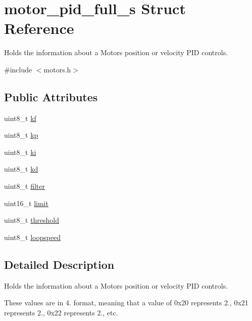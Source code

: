 \hypertarget{structmotor__pid__full__s}{}\section{motor\+\_\+pid\+\_\+full\+\_\+s Struct Reference}
\label{structmotor__pid__full__s}


Holds the information about a Motor\textquotesingle{}s position or velocity P\+ID controls.  




{\ttfamily \#include $<$motors.\+h$>$}

\subsection*{Public Attributes}
\begin{DoxyCompactItemize}
\item 
uint8\+\_\+t \mbox{\hyperlink{structmotor__pid__full__s_aca37978c9743342bf520dcadf2eed67c}{kf}}
\item 
uint8\+\_\+t \mbox{\hyperlink{structmotor__pid__full__s_a5c90af94c336d26a8ecdd4b88f06c9d9}{kp}}
\item 
uint8\+\_\+t \mbox{\hyperlink{structmotor__pid__full__s_ad6800234728012e59dc6c945cc6465d5}{ki}}
\item 
uint8\+\_\+t \mbox{\hyperlink{structmotor__pid__full__s_a02e542bcec0f870af870cd37a4e2a922}{kd}}
\item 
uint8\+\_\+t \mbox{\hyperlink{structmotor__pid__full__s_af6f15fc8e1a49098f69aba255a3b21c6}{filter}}
\item 
uint16\+\_\+t \mbox{\hyperlink{structmotor__pid__full__s_a98141ce9bce70a500cf18c7a92d866c5}{limit}}
\item 
uint8\+\_\+t \mbox{\hyperlink{structmotor__pid__full__s_a50b463b6ffd906bfef9ae1edc7cc872e}{threshold}}
\item 
uint8\+\_\+t \mbox{\hyperlink{structmotor__pid__full__s_a567385b82081690c526a618b2110e030}{loopspeed}}
\end{DoxyCompactItemize}


\subsection{Detailed Description}
Holds the information about a Motor\textquotesingle{}s position or velocity P\+ID controls. 

These values are in 4. format, meaning that a value of 0x20 represents 2., 0x21 represents 2., 0x22 represents 2., etc. 

